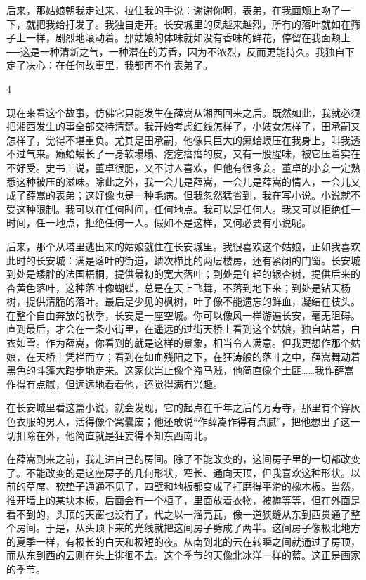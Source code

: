 后来，那姑娘朝我走过来，拉住我的手说：谢谢你啊，表弟，在我面颊上吻了一下，就把我给打发了。我独自走开。长安城里的凤越来越烈，所有的落叶就如在筛子上一样，剧烈地滚动着。那姑娘的体味就如没有香味的鲜花，停留在我面颊上──这是一种清新之气，一种潜在的芳香，因为不浓烈，反而更能持久。我独自下定了决心：在任何故事里，我都再不作表弟了。 

4 

现在来看这个故事，仿佛它只能发生在薛嵩从湘西回来之后。既然如此，我就必须把湘西发生的事全部交待清楚。我开始考虑红线怎样了，小妓女怎样了，田承嗣又怎样了，觉得不堪重负。尤其是田承嗣，他像只巨大的癞蛤蟆压在我身上，叫我透不过气来。癞蛤蟆长了一身软塌塌、疙疙瘩瘩的皮，又有一股腥味，被它压着实在不好受。史书上说，董卓很肥，又不讨人喜欢，但他有很多妾。董卓的小妾一定熟悉这种被压的滋味。除此之外，我一会儿是薛嵩，一会儿是薛嵩的情人，一会儿又成了薛嵩的表弟；这好像也是一种毛病。但我忽然猛省到，我在写小说。小说就不受这种限制。我可以在任何时间，任何地点。我可以是任何人。我又可以拒绝任一时间，任一地点，拒绝任何一人。假如不是这样，叉何必要有小说呢。 

后来，那个从塔里逃出来的姑娘就住在长安城里。我很喜欢这个姑娘，正如我喜欢此时的长安城：满是落叶的街道，鳞次栉比的两层楼房，还有紧闭的门窗。长安城到处是矮胖的法国梧桐，提供最初的宽大落叶；到处是年轻的银杏树，提供后来的杏黄色落叶，这种落叶像蝴蝶，总是在天上飞舞，不落到地下来；到处是钻天杨树，提供清脆的落叶。最后是少见的枫树，叶子像不能遗忘的鲜血，凝结在枝头。在整个自由奔放的秋季，长安是一座空城。你可以像风一样游遍长安，毫无阻碍。直到最后，才会在一条小街里，在遥远的过街天桥上看到这个姑娘，独自站着，白衣如雪。作为薛嵩，你看到的就是这样的景象，相当令人满意。但我更想作那个姑娘，在天桥上凭栏而立；看到在如血残阳之下，在狂涛般的落叶之中，薛嵩舞动着黑色的斗篷大踏步地走来。这家伙岂止像个盗马贼，他简直像个土匪……我作薛嵩作得有点腻，但远远地看看他，还觉得满有兴趣。 

在长安城里看这篇小说，就会发现，它的起点在千年之后的万寿寺，那里有个穿灰色衣服的男人，活得像个窝囊废；他还敢说“作薛嵩作得有点腻”，把他想出了这一切扣除在外，他简直就是狂妄得不知东西南北。 

在薛嵩到来之前，我走进自己的房间。除了不能改变的，这间房子里的一切都改变了。不能改变的是这座房子的几何形状，窄长、通向天顶，但我喜欢这种形状。以前的草席、软垫子通通不见了，四壁和地板都变成了打磨得平滑的橡木板。当然，推开墙上的某块木板，后面会有一个柜子，里面放着衣物，被褥等等，但在外面是看不到的，头顶的天窗也没有了，代之以一溜亮瓦，像一道狭缝从东到西贯通了整个房间。于是，从头顶下来的光线就把这间房子劈成了两半。这间房子像极北地方的夏季一样，有极长的白天和极短的夜。从南到北的云在转瞬之间就通过了房顶，而从东到西的云则在头上徘徊不去。这个季节的天像北冰洋一样的蓝。这正是画家的季节。 

